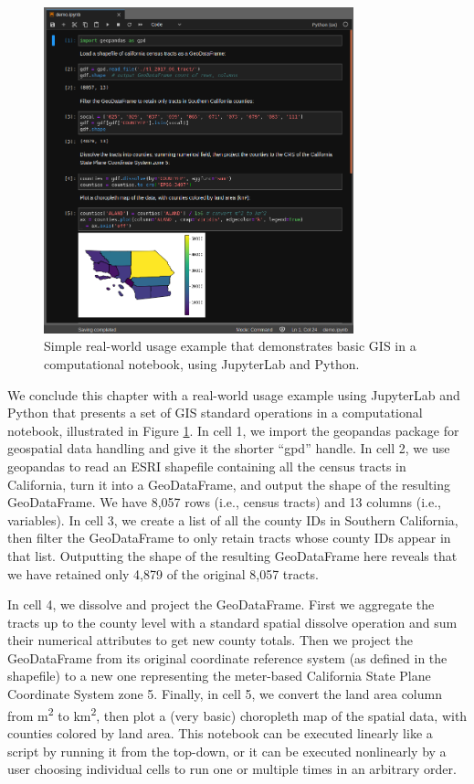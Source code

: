 \documentclass[11pt,letterpaper]{article}
\begin{document}
\begin{figure}[htb]
	\centering
	\includegraphics[width=0.8\textwidth]{code-demo.png}
	\caption{Simple real-world usage example that demonstrates basic GIS in a computational notebook, using JupyterLab and Python.}
	\label{fig:code_demo}
\end{figure}

We conclude this chapter with a real-world usage example using JupyterLab and Python that presents a set of GIS standard operations in a computational notebook, illustrated in Figure \ref{fig:code_demo}. In cell 1, we import the geopandas package for geospatial data handling and give it the shorter \enquote{gpd} handle. In cell 2, we use geopandas to read an ESRI shapefile containing all the census tracts in California, turn it into a GeoDataFrame, and output the shape of the resulting GeoDataFrame. We have 8,057 rows (i.e., census tracts) and 13 columns (i.e., variables). In cell 3, we create a list of all the county IDs in Southern California, then filter the GeoDataFrame to only retain tracts whose county IDs appear in that list. Outputting the shape of the resulting GeoDataFrame here reveals that we have retained only 4,879 of the original 8,057 tracts.

In cell 4, we dissolve and project the GeoDataFrame. First we aggregate the tracts up to the county level with a standard spatial dissolve operation and sum their numerical attributes to get new county totals. Then we project the GeoDataFrame from its original coordinate reference system (as defined in the shapefile) to a new one representing the meter-based California State Plane Coordinate System zone 5. Finally, in cell 5, we convert the land area column from m\textsuperscript{2} to km\textsuperscript{2}, then plot a (very basic) choropleth map of the spatial data, with counties colored by land area. This notebook can be executed linearly like a script by running it from the top-down, or it can be executed nonlinearly by a user choosing individual cells to run one or multiple times in an arbitrary order.
\end{document}

